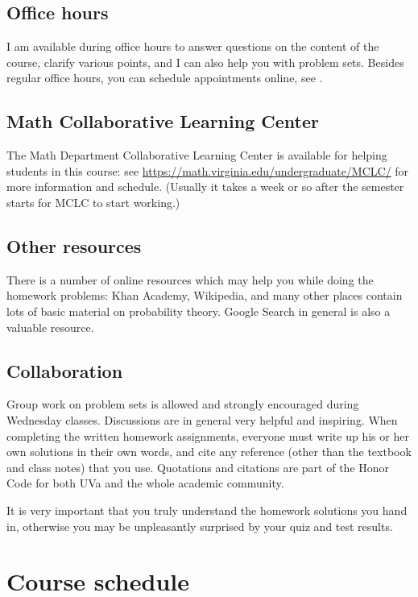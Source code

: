 \documentclass[oneside,11pt]{amsart}
\begin{document}
\subsection{Office hours}

I am available during office hours to answer questions on the content of the 
course, clarify various points, and I can also help you with problem sets. 
Besides regular office hours, you can schedule appointments online, see 
.

\subsection{Math Collaborative Learning Center}

The Math Department 
Collaborative Learning Center
is available for helping students in this course: 
see \url{https://math.virginia.edu/undergraduate/MCLC/}
for more information and schedule. 
(Usually it takes a week or so after the semester starts for MCLC to start working.)

\subsection{Other resources}

There is a number of online resources which may help you while doing the homework problems:
Khan Academy, Wikipedia, and many other 
places contain lots of basic material on probability theory. Google Search
in general
is also a valuable resource.

\subsection{Collaboration}
\label{collaboration}

Group work on problem sets is allowed and strongly encouraged during Wednesday classes.
Discussions are in general very helpful and inspiring. When completing the written homework assignments, everyone must write up his or her own
solutions in their own words, and cite any reference 
(other than the textbook and
class notes) that you use. Quotations and citations are part of the Honor Code for both UVa
and the whole academic community. 

It is very important that you truly understand the homework solutions you hand
in, otherwise you may be unpleasantly surprised by your quiz and test results.

\section{Course schedule}
\label{sub:schedule}
\end{document}
